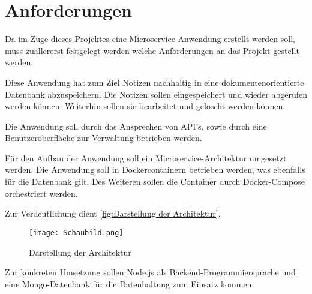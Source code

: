 
\chapter{Anforderungen}
\label{ch:Anforderungen}
Da im Zuge dieses Projektes eine Microservice-Anwendung erstellt werden soll, muss zuallererst festgelegt werden welche Anforderungen an das Projekt gestellt werden.

Diese Anwendung hat zum Ziel Notizen nachhaltig in eine dokumentenorientierte Datenbank abzuspeichern. Die Notizen sollen eingespeichert und wieder abgerufen werden können. Weiterhin sollen sie bearbeitet und gelöscht werden können.

Die Anwendung soll durch das Ansprechen von API's, sowie durch eine Benutzeroberfläche zur Verwaltung betrieben werden.

Für den Aufbau der Anwendung soll ein Microservice-Architektur umgesetzt werden.
Die Anwendung soll in Dockercontainern betrieben werden, was ebenfalls für die Datenbank gilt. Des Weiteren sollen die Container durch Docker-Compose orchestriert werden.

Zur Verdeutlichung dient \autoref{fig:Darstellung der Architektur}.
\begin{center}
\begin{figure}[h!]
\centering
\texttt{[image: Schaubild.png]}
\vspace{1pt}
\caption{Darstellung der Architektur}
\label{fig:Darstellung der Architektur}
\end{figure}
\end{center}
Zur konkreten Umsetzung sollen Node.js als Backend-Programmiersprache und eine Mongo-Datenbank für die Datenhaltung zum Einsatz kommen.

